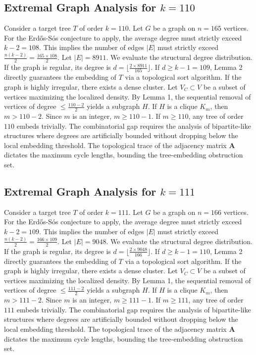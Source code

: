 \documentclass[11pt,a4paper]{article}
\begin{document}
\subsection{Extremal Graph Analysis for $k=110$}
Consider a target tree $T$ of order $k=110$.
Let $G$ be a graph on $n=165$ vertices.
For the Erd\H{o}s-S\'os conjecture to apply, the average degree must strictly exceed $k-2 = 108$.
This implies the number of edges $|E|$ must strictly exceed $\frac{n(k-2)}{2} = \frac{165 \times 108}{2}$.
Let $|E| = 8911$.
We evaluate the structural degree distribution. If the graph is regular, its degree is $d = \lfloor \frac{2 \times 8911}{165} \rfloor$.
If $d \geq k-1 = 109$, Lemma 2 directly guarantees the embedding of $T$ via a topological sort algorithm.
If the graph is highly irregular, there exists a dense cluster. Let $V_C \subset V$ be a subset of vertices maximizing the localized density.
By Lemma 1, the sequential removal of vertices of degree $\leq \frac{110-2}{2}$ yields a subgraph $H$.
If $H$ is a clique $K_{m}$, then $m > 110-2$. Since $m$ is an integer, $m \geq 110-1$. If $m \geq 110$, any tree of order $110$ embeds trivially.
The combinatorial gap requires the analysis of bipartite-like structures where degrees are artificially bounded without dropping below the local embedding threshold. The topological trace of the adjacency matrix $\mathbf{A}$ dictates the maximum cycle lengths, bounding the tree-embedding obstruction set.


\subsection{Extremal Graph Analysis for $k=111$}
Consider a target tree $T$ of order $k=111$.
Let $G$ be a graph on $n=166$ vertices.
For the Erd\H{o}s-S\'os conjecture to apply, the average degree must strictly exceed $k-2 = 109$.
This implies the number of edges $|E|$ must strictly exceed $\frac{n(k-2)}{2} = \frac{166 \times 109}{2}$.
Let $|E| = 9048$.
We evaluate the structural degree distribution. If the graph is regular, its degree is $d = \lfloor \frac{2 \times 9048}{166} \rfloor$.
If $d \geq k-1 = 110$, Lemma 2 directly guarantees the embedding of $T$ via a topological sort algorithm.
If the graph is highly irregular, there exists a dense cluster. Let $V_C \subset V$ be a subset of vertices maximizing the localized density.
By Lemma 1, the sequential removal of vertices of degree $\leq \frac{111-2}{2}$ yields a subgraph $H$.
If $H$ is a clique $K_{m}$, then $m > 111-2$. Since $m$ is an integer, $m \geq 111-1$. If $m \geq 111$, any tree of order $111$ embeds trivially.
The combinatorial gap requires the analysis of bipartite-like structures where degrees are artificially bounded without dropping below the local embedding threshold. The topological trace of the adjacency matrix $\mathbf{A}$ dictates the maximum cycle lengths, bounding the tree-embedding obstruction set.
\end{document}
